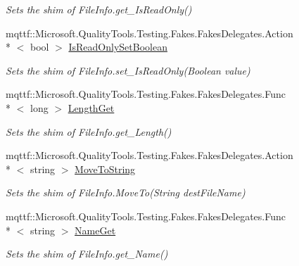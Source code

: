 \begin{DoxyCompactItemize}
\begin{DoxyCompactList}\small\item\em Sets the shim of File\-Info.\-get\-\_\-\-Is\-Read\-Only()\end{DoxyCompactList}\item 
mqttf\-::\-Microsoft.\-Quality\-Tools.\-Testing.\-Fakes.\-Fakes\-Delegates.\-Action\\*
$<$ bool $>$ \hyperlink{class_system_1_1_i_o_1_1_fakes_1_1_shim_file_info_a20dd265ff7ebc7b051ebdc48ea9270ff}{Is\-Read\-Only\-Set\-Boolean}
\begin{DoxyCompactList}\small\item\em Sets the shim of File\-Info.\-set\-\_\-\-Is\-Read\-Only(\-Boolean value)\end{DoxyCompactList}\item 
mqttf\-::\-Microsoft.\-Quality\-Tools.\-Testing.\-Fakes.\-Fakes\-Delegates.\-Func\\*
$<$ long $>$ \hyperlink{class_system_1_1_i_o_1_1_fakes_1_1_shim_file_info_a50e2b3a3378ad95719e0259f436f3428}{Length\-Get}
\begin{DoxyCompactList}\small\item\em Sets the shim of File\-Info.\-get\-\_\-\-Length()\end{DoxyCompactList}\item 
mqttf\-::\-Microsoft.\-Quality\-Tools.\-Testing.\-Fakes.\-Fakes\-Delegates.\-Action\\*
$<$ string $>$ \hyperlink{class_system_1_1_i_o_1_1_fakes_1_1_shim_file_info_a4cd434c5174efce6924bbcce413d91b9}{Move\-To\-String}
\begin{DoxyCompactList}\small\item\em Sets the shim of File\-Info.\-Move\-To(\-String dest\-File\-Name)\end{DoxyCompactList}\item 
mqttf\-::\-Microsoft.\-Quality\-Tools.\-Testing.\-Fakes.\-Fakes\-Delegates.\-Func\\*
$<$ string $>$ \hyperlink{class_system_1_1_i_o_1_1_fakes_1_1_shim_file_info_a673e2ce777e13d0e75ad971509dded3b}{Name\-Get}
\begin{DoxyCompactList}\small\item\em Sets the shim of File\-Info.\-get\-\_\-\-Name()\end{DoxyCompactList}\item 

\end{DoxyCompactItemize}
